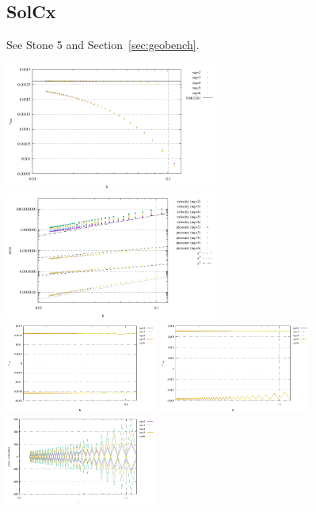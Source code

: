 \subsection*{SolCx}

See Stone 5 and Section~\ref{sec:geobench}.

\begin{center}
\includegraphics[width=7cm]{python_codes/fieldstone_80/results/solcx/vrms}
\includegraphics[width=7cm]{python_codes/fieldstone_80/results/solcx/errors}\\
\includegraphics[width=5cm]{python_codes/fieldstone_80/results/solcx/stats_u}
\includegraphics[width=5cm]{python_codes/fieldstone_80/results/solcx/stats_v}
\includegraphics[width=5cm]{python_codes/fieldstone_80/results/solcx/stats_p}\\
\end{center}


